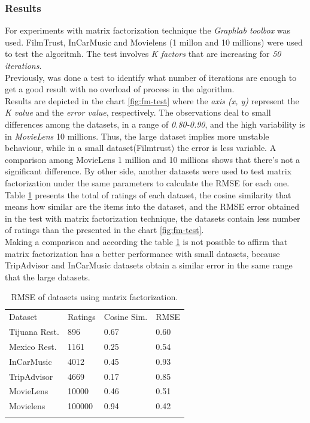 \subsubsection{Results} 

For experiments with matrix factorization technique the \textit{Graphlab
toolbox} was used. FilmTrust, InCarMusic and Movielens (1 millon and
10 millions) were used to test the algoritmh. The test involves \textit{K
factors} that are increasing for \textit{50 iterations}.\\ Previously, was 
done a test to identify what number of iterations are enough to get a good
result with no overload of process in the algorithm. \\ Results are
depicted in the chart \ref{fig:fm-test} where the \textit{axis (x, y)}
represent the \textit{K value} and the \textit{error value}, respectively. 
The observations deal to small differences among the datasets, in a range
of \textit{0.80-0.90}, and the high variability is in \textit{MovieLens} 10
millions. Thus, the large dataset implies more unstable 
behaviour, while in a small dataset(Filmtrust) the error is less variable.
A comparison among MovieLens 1 million and 10 millions shows that 
there's not a significant difference. 
By other side, another datasets were used to test matrix factorization
under the same parameters to calculate the RMSE for each one.\\ Table
\ref{tab:mf-set} presents the total of ratings of each dataset, the
cosine similarity that means how similar are the items into the
dataset, and the RMSE error obtained in the test with matrix
factorization technique, the datasets contain less number of ratings than
the presented in the chart \ref{fig:fm-test}. \\ Making a comparison 
and according the table \ref{tab:mf-set} is not possible 
to affirm that matrix factorization has a better performance 
with small datasets, because TripAdvisor and InCarMusic datasets 
obtain a similar error in the same range that the large datasets.
\begin{table}
\centering
\small
\captionsetup{font=footnotesize}
\caption{RMSE of datasets using matrix factorization.}
\label{tab:mf-set}   
\begin{tabular}{llll}
\hline\noalign{\smallskip}
Dataset & Ratings & Cosine Sim. & RMSE \\
\noalign{\smallskip}\hline\noalign{\smallskip}
Tijuana Rest.  &    896       &  0.67    &   0.60 \\
Mexico Rest.  &   1161       &  0.25    &  0.54 \\
InCarMusic    &    4012      &  0.45     &  0.93 \\
TripAdvisor    &    4669      &  0.17     &  0.85 \\
MovieLens    &    10000     &   0.46    &  0.51 \\
Movielens    &     100000   &   0.94    &  0.42 \\
\noalign{\smallskip}\hline
\end{tabular}
\end{table}

